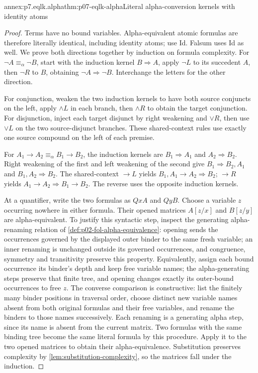 \begin{annexitem}{annex:p7.eqlk.alpha}{thm:p07-eqlk-alpha}{Literal alpha-conversion kernels with identity atoms}
\begin{proof}
Terms have no bound variables. Alpha-equivalent atomic formulas are
therefore literally identical, including identity atoms; use Id. Falsum
uses Id as well. We prove both directions together by induction on formula
complexity. For \(\neg A\equiv_\alpha\neg B\), start with the induction
kernel \(B\Rightarrow A\), apply \(\neg L\) to its succedent \(A\),
then \(\neg R\) to \(B\), obtaining
\(\neg A\Rightarrow\neg B\). Interchange the letters for the other direction.

For conjunction, weaken the two induction kernels to have both source
conjuncts on the left, apply \(\land L\) in each branch, then
\(\land R\) to obtain the target conjunction. For disjunction, inject
each target disjunct by right weakening and \(\lor R\), then use
\(\lor L\) on the two source-disjunct branches. These shared-context
rules use exactly one source compound on the left of each premise.

For \(A_1\to A_2\equiv_\alpha B_1\to B_2\), the induction kernels
are \(B_1\Rightarrow A_1\) and \(A_2\Rightarrow B_2\).
Right weakening of the first and left weakening of the second give
\(B_1\Rightarrow B_2,A_1\) and
\(B_1,A_2\Rightarrow B_2\). The shared-context \(\to L\) yields
\(B_1,A_1\to A_2\Rightarrow B_2\); \(\to R\) yields
\(A_1\to A_2\Rightarrow B_1\to B_2\). The reverse uses the
opposite induction kernels.

At a quantifier, write the two formulas as \(QxA\) and \(QyB\).
Choose a variable \(z\) occurring nowhere in either formula. Their opened
matrices \(A[z/x]\) and \(B[z/y]\) are alpha-equivalent. To justify
this syntactic step, inspect the generating alpha-renaming relation of
\cref{def:p02-fol-alpha-equivalence}: opening sends the occurrences governed
by the displayed outer binder to the same fresh variable; an inner
renaming is unchanged outside its governed occurrences, and congruence,
symmetry and transitivity preserve this property. Equivalently, assign
each bound occurrence its binder's depth and keep free variable names;
the alpha-generating steps preserve that finite tree, and opening changes
exactly its outer-bound occurrences to free \(z\). The converse comparison
is constructive: list the finitely many binder positions in traversal order,
choose distinct new variable names absent from both original formulas and
their free variables, and rename the binders to those names successively.
Each renaming is a generating alpha step, since its name is absent from
the current matrix. Two formulas with the same binding tree become the
same literal formula by this procedure. Apply it to the two opened matrices
to obtain their alpha-equivalence. Substitution preserves complexity by
\cref{lem:substitution-complexity}, so the matrices fall under the induction.


\end{proof}
\end{annexitem}
